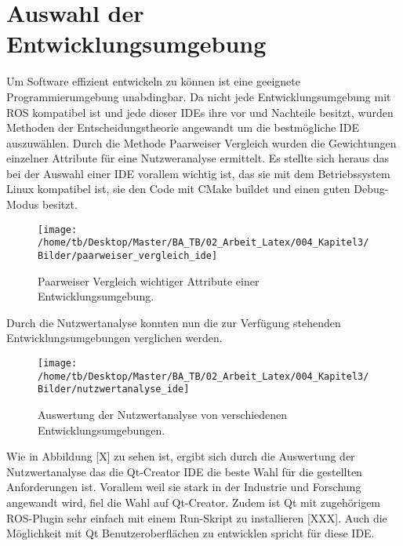 %

\chapter{Auswahl der Entwicklungsumgebung}
\label{cha:Auswahl der Entwicklungsumgebung} 

Um Software effizient entwickeln zu k{\"o}nnen ist eine geeignete Programmierumgebung unabdingbar. 
Da nicht jede Entwicklungsumgebung mit ROS kompatibel ist und jede dieser IDEs ihre vor und Nachteile besitzt, wurden Methoden der Entscheidungstheorie angewandt um die bestm{\"o}gliche IDE auszuw{\"a}hlen. Durch die Methode Paarweiser Vergleich wurden die Gewichtungen einzelner Attribute f\"ur eine Nutzweranalyse ermittelt. Es stellte sich heraus das bei der Auswahl einer IDE vorallem wichtig ist, das sie mit dem Betriebssystem Linux kompatibel ist, sie den Code mit CMake buildet und einen guten Debug-Modus besitzt.

\begin{figure}[H]
\begin{center}
  \texttt{[image: /home/tb/Desktop/Master/BA\_TB/02\_Arbeit\_Latex/004\_Kapitel3/Bilder/paarweiser\_vergleich\_ide]}%
  \caption[PaarweiserVergleichIDE]%
           {\label{fig:PaarweiserVergleichIDE}%
           Paarweiser Vergleich wichtiger Attribute einer Entwicklungsumgebung.}
\end{center}
\end{figure}

Durch die Nutzwertanalyse konnten nun die zur Verf\"ugung stehenden Entwicklungsumgebungen verglichen werden. 

\begin{figure}[H]
\begin{center}
  \texttt{[image: /home/tb/Desktop/Master/BA\_TB/02\_Arbeit\_Latex/004\_Kapitel3/Bilder/nutzwertanalyse\_ide]}%
  \caption[NutzwertAnalyseIDE]%
           {\label{fig:NutzwertAnalyseIDE}%
           Auswertung der Nutzwertanalyse von verschiedenen Entwicklungsumgebungen.}
\end{center}
\end{figure}


Wie in Abbildung [X] zu sehen ist, ergibt sich durch die Auswertung der Nutzwertanalyse das die Qt-Creator IDE die beste Wahl f{\"u}r die gestellten Anforderungen ist. Vorallem weil sie stark in der Industrie und Forschung angewandt wird, fiel die Wahl auf Qt-Creator. Zudem ist Qt mit zugeh{\"o}rigem ROS-Plugin sehr einfach mit einem Run-Skript zu installieren [XXX]. Auch die M{\"o}glichkeit mit Qt Benutzeroberfl{\"a}chen zu entwicklen spricht f\"ur diese IDE.






